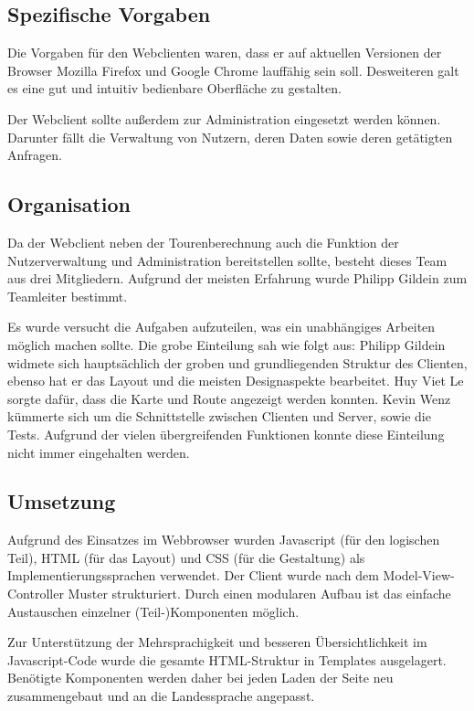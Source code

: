 \subsection*{Spezifische Vorgaben}

Die Vorgaben für den Webclienten waren, dass er auf aktuellen Versionen der Browser Mozilla Firefox und Google Chrome lauffähig sein soll.
Desweiteren galt es eine gut und intuitiv bedienbare Oberfläche zu gestalten.

Der Webclient sollte außerdem zur Administration eingesetzt werden können.
Darunter fällt die Verwaltung von Nutzern, deren Daten sowie deren getätigten Anfragen.

\subsection*{Organisation}

Da der Webclient neben der Tourenberechnung auch die Funktion der Nutzerverwaltung und Administration bereitstellen sollte, besteht dieses Team aus drei Mitgliedern. 
Aufgrund der meisten Erfahrung wurde Philipp Gildein zum Teamleiter bestimmt.

Es wurde versucht die Aufgaben aufzuteilen, was ein unabhängiges Arbeiten möglich machen sollte.
Die grobe Einteilung sah wie folgt aus: Philipp Gildein widmete sich hauptsächlich der groben und grundliegenden Struktur des Clienten, ebenso hat er das Layout und die meisten Designaspekte bearbeitet.
Huy Viet Le sorgte dafür, dass die Karte und Route angezeigt werden konnten.
Kevin Wenz kümmerte sich um die Schnittstelle zwischen Clienten und Server, sowie die Tests.
Aufgrund der vielen übergreifenden Funktionen konnte diese Einteilung nicht immer eingehalten werden.

\subsection*{Umsetzung}

Aufgrund des Einsatzes im Webbrowser wurden Javascript (für den logischen Teil), HTML (für das Layout) und CSS (für die Gestaltung) als Implementierungssprachen verwendet.
Der Client wurde nach dem Model-View-Controller Muster strukturiert.
Durch einen modularen Aufbau ist das einfache Austauschen einzelner (Teil-)Komponenten möglich.

Zur Unterstützung der Mehrsprachigkeit und besseren Übersichtlichkeit im Javascript-Code wurde die gesamte HTML-Struktur in Templates ausgelagert.
Benötigte Komponenten werden daher bei jeden Laden der Seite neu zusammengebaut und an die Landessprache angepasst.

